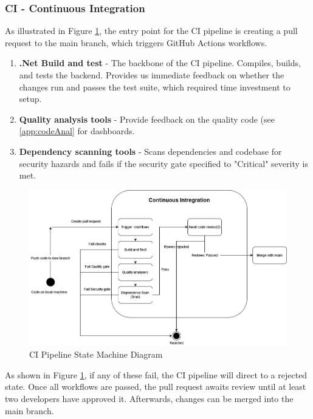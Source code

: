 \subsubsection{CI - Continuous Integration}
\label{subsubsec:ci}
As illustrated in Figure \ref{fig:CIStateMachine}, the entry point for the CI pipeline is creating a pull request to the main branch, which triggers GitHub Actions workflows.
\begin{enumerate}
    \item \textbf{.Net Build and test} - The backbone of the CI pipeline. Compiles, builds, and tests the backend. Provides us immediate feedback on whether the changes run and passes the test suite, which required time investment to setup.
    \item \textbf{Quality analysis tools} - Provide feedback on the quality code (see \ref{app:codeAnal} for dashboards.
    \item \textbf{Dependency scanning tools} - Scans dependencies and codebase for security hazards and fails if the security gate specified to "Critical" severity is met.
\end{enumerate}


\begin {figure}[H]
    \centering
    \includegraphics[scale=0.50]{images/ci_cd_diagrams/DevopsDiagrams-StateMachine CI.drawio(4).png}
    \caption{CI Pipeline State Machine Diagram}
    \label{fig:CIStateMachine}
\end{figure}
As shown in Figure \ref{fig:CIStateMachine}, if any of these fail, the CI pipeline will direct to a rejected state. Once all workflows are passed, the pull request awaits review until at least two developers have approved it. Afterwards, changes can be merged into the main branch.

